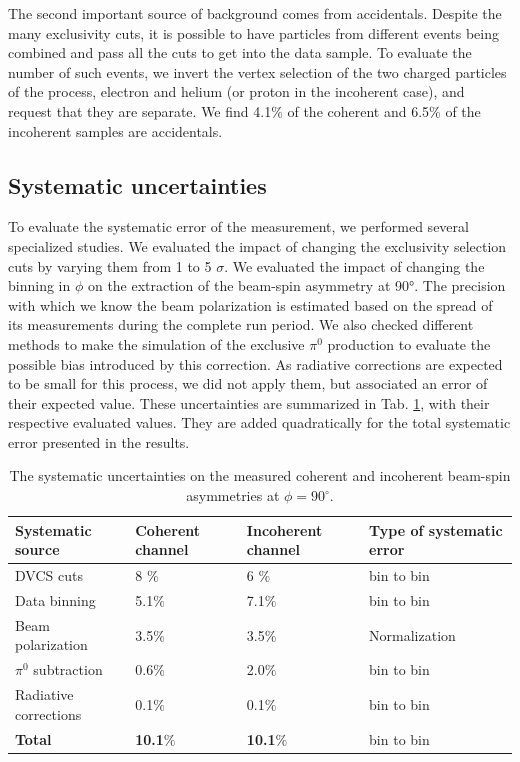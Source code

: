 \documentclass[aps,prc,preprint,superscriptaddress]{revtex4}
\begin{document}
The second important source of background comes from accidentals. Despite the many exclusivity cuts, it is 
possible to have particles from different events being combined and pass all the cuts to get 
into the data sample. To evaluate the number of such events, we invert the vertex selection 
of the two charged 
particles of the process, electron and helium (or proton in the incoherent case), and request that they
are separate. We find 4.1\% of the coherent and 6.5\% of the incoherent samples are accidentals. 

\subsection{Systematic uncertainties}

To evaluate the systematic error of the measurement, we performed several specialized studies. We 
evaluated the impact of changing the exclusivity selection cuts by varying them from 1 to 5 $\sigma$. 
We evaluated the impact of changing the binning in $\phi$ on the extraction of the beam-spin asymmetry
at 90°. The precision with which we know the beam polarization is estimated based on the spread 
of its measurements during the complete run period. We also checked different methods to make the 
simulation of the exclusive $\pi^0$ production to evaluate the 
possible bias introduced by this correction. As radiative corrections are expected to be small
for this process, we did not apply them, but associated an error of their expected value.
These uncertainties are summarized in Tab. \ref{Table:systematic_uncertainties}, with their respective 
evaluated values. They are added quadratically for the total systematic error presented in the results.

\begin{table}[tbp]
\begin{center}
	\begin{tabular}{|m{4cm}|m{2cm}<{\centering}|m{2.3cm}<{\centering}|m{3.7cm}<{\centering}|}
\hline
\bf Systematic source & \bf  Coherent channel  & \bf Incoherent channel & \bf Type of systematic 
error\\
\hline
DVCS cuts & 8 $\%$ &  6 $\%$ & bin to bin\\
\hline
Data binning & 5.1$\%$ & 7.1$\%$ &bin to bin\\
\hline
Beam polarization &  3.5$\%$ &  3.5$\%$& Normalization\\
\hline
$\pi^0$ subtraction &  0.6$\%$ &  2.0$\%$ &bin to bin\\
\hline
Radiative corrections &  0.1$\%$ & 0.1$\%$ & bin to bin\\
\hline
\textbf{Total} &  \textbf{10.1}$\%$ &   \textbf{10.1}$\%$ &bin to 
bin\\
\hline
\end{tabular}
\caption{The systematic uncertainties on the measured coherent and incoherent 
beam-spin asymmetries at $\phi = 90^{\circ}$.}
\label{Table:systematic_uncertainties}
\end{center}
\end{table}
\end{document}
